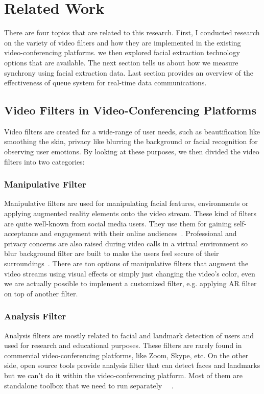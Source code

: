 
\chapter{Related Work}\label{chapter:related_work}

There are four topics that are related to this research. 
First, I conducted research on the variety of video filters and how they are implemented in the existing video-conferencing platforms.
we then explored facial extraction technology options that are available. The next section tells us about how we measure synchrony using facial extraction data.
Last section provides an overview of the effectiveness of queue system for real-time data communications.

\section{Video Filters in Video-Conferencing Platforms}

Video filters are created for a wide-range of user needs, such as beautification like smoothing the skin, 
privacy like blurring the background or facial recognition for observing user emotions. By looking at these purposes, 
we then divided the video filters into two categories:
\subsection{Manipulative Filter}
Manipulative filters are used for manipulating facial features, environments or applying augmented reality elements onto the video stream.
These kind of filters are quite well-known from social media users. 
They use them for gaining self-acceptance and engagement with their online audiences~\parencite{ar-filter-on-social-media}.
Professional and privacy concerns are also raised during video calls in a virtual environment so 
blur background filter are built to make the users feel secure of their surroundings~\parencite{blur-privacy-ar}.
There are ton options of manipulative filters that augment the video streams using visual effects or simply just changing the video's color, 
even we are actually possible to implement a customized filter, e.g. applying AR filter on top of another filter.

\subsection{Analysis Filter}
Analysis filters are mostly related to facial and landmark detection of users and used for research and educational purposes. 
These filters are rarely found in commercial video-conferencing platforms, like Zoom, Skype, etc. On the other side, 
open source tools provide analysis filter that can detect faces and landmarks but we can't do it within the video-conferencing platform.
Most of them are standalone toolbox that we need to run separately ~\parencite{tracked}~\parencite{openface}.


